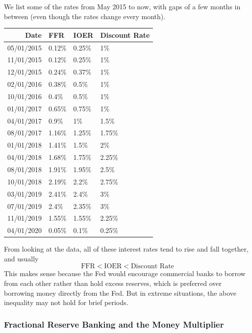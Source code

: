 \documentclass{article}
\begin{document}
      \begin{example}
        We list some of the rates from May 2015 to now, with gaps of a few months in between (even though the rates change every month). 
        \begin{center}
        \begin{tabular}{r|l|l|l}
          Date & FFR& IOER & Discount Rate\\
          \hline
          05/01/2015 & 0.12\% & 0.25\% & 1\% \\
          11/01/2015 & 0.12\% & 0.25\% & 1\% \\
          12/01/2015 & 0.24\% & 0.37\% & 1\% \\
          02/01/2016 & 0.38\% & 0.5\% & 1\% \\
          10/01/2016 & 0.4\% & 0.5\% & 1\% \\
          01/01/2017 & 0.65\% & 0.75\% & 1\% \\
          04/01/2017 & 0.9\% & 1\% & 1.5\% \\
          08/01/2017 & 1.16\% & 1.25\% & 1.75\% \\
          01/01/2018 & 1.41\% & 1.5\% & 2\% \\
          04/01/2018 & 1.68\% & 1.75\% & 2.25\% \\
          08/01/2018 & 1.91\% & 1.95\% & 2.5\% \\
          10/01/2018 & 2.19\% & 2.2\% & 2.75\% \\
          03/01/2019 & 2.41\% & 2.4\% & 3\% \\
          07/01/2019 & 2.4\% & 2.35\% & 3\% \\
          11/01/2019 & 1.55\% & 1.55\% & 2.25\% \\
          04/01/2020 & 0.05\% & 0.1\% & 0.25\% 
        \end{tabular}
        \end{center}
      \end{example}

      From looking at the data, all of these interest rates tend to rise and fall together, and usually
      \[\text{FFR} < \text{IOER} < \text{Discount Rate}\]
      This makes sense because the Fed would encourage commercial banks to borrow from each other rather than hold excess reserves, which is preferred over borrowing money directly from the Fed. But in extreme situations, the above inequality may not hold for brief periods. 

    \subsubsection{Fractional Reserve Banking and the Money Multiplier}
\end{document}
